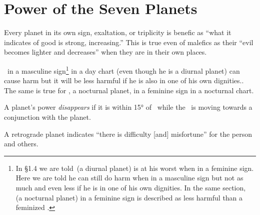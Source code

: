 \section{Power of the Seven Planets}

Every planet in its own sign, exaltation, or triplicity is benefic as ``what it indicates of good is strong, increasing.'' This is true even of malefics as their ``evil becomes lighter and decreases'' when they are in their own places.

\Saturn\, in a masculine sign\footnote{In \S1.4 we are told \Saturn\,(a diurnal planet) is at his worst when in a feminine sign. Here we are told he can still do harm when in a masculine sign but not as much and even less if he is in one of his own dignities. In the same section, \Mars\, (a nocturnal planet) in a feminine sign is described as less harmful than a feminized \Saturn.} in a day chart (even though he is a diurnal planet) can cause harm but it will be less harmful if he is also in one of his own dignities.. The same is true for \Mars, a nocturnal planet, in a feminine sign in a nocturnal chart. 

A planet's power \textsl{disappears} if it is within 15° of \Sun\, while the \Sun\, is moving towards a conjunction with the planet.

A retrograde planet indicates ``there is difficulty [and] misfortune'' for the person and others.

